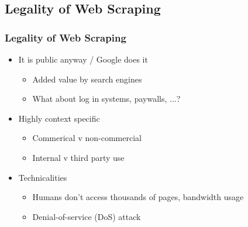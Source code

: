 \subsection{Legality of Web Scraping}
\begin{frame}
    \frametitle{Legality of Web Scraping}

\begin{itemize}
    \item It is public anyway / Google does it
    \begin{itemize}
    \item Added value by search engines
    \item What about log in systems, paywalls, ...?
    \end{itemize}
\end{itemize}

\begin{itemize}
    \item Highly context specific
    \begin{itemize}
    \item Commerical v non-commercial
    \item Internal v third party use
    \end{itemize}
\end{itemize}

\begin{itemize}
    \item Technicalities
    \begin{itemize}
    \item Humans don't access thousands of pages, bandwidth usage
    \item Denial-of-service (DoS) attack
    \end{itemize}
\end{itemize}

\end{frame}


